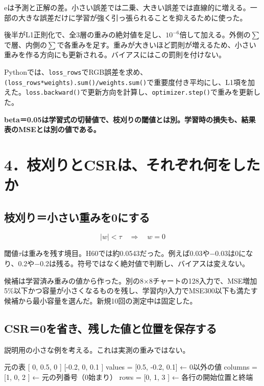 \documentclass[
  11pt,
  a4paper,
]{article}
\newenvironment{Shaded}{}{}
\newcommand{\NormalTok}[1]{#1}
\begin{document}
eは予測と正解の差。小さい誤差では二乗、大きい誤差では直線的に増える。一部の大きな誤差だけに学習が強く引っ張られることを抑えるために使った。

後半がL1正則化で、全3層の重みの絶対値を足し、\(10^{-6}\)倍して加える。外側の\(\sum\)で層、内側の\(\sum\)で各重みを足す。重みが大きいほど罰則が増えるため、小さい重みを作る方向にも更新される。バイアスにはこの罰則を付けない。

Pythonでは、\texttt{loss\_rows}でRGB誤差を求め、\texttt{(loss\_rows*weights).sum()/weights.sum()}で重要度付き平均にし、L1項を加えた。\texttt{loss.backward()}で更新方向を計算し、\texttt{optimizer.step()}で重みを更新した。

\textbf{beta＝0.05は学習式の切替値で、枝刈りの閾値とは別。学習時の損失も、結果表のMSEとは別の値である。}

\newpage

\section{4．枝刈りとCSRは、それぞれ何をしたか}\label{ux679dux5208ux308aux3068csrux306fux305dux308cux305eux308cux4f55ux3092ux3057ux305fux304b}

\subsection{枝刈り＝小さい重みを0にする}\label{ux679dux5208ux308aux5c0fux3055ux3044ux91cdux307fux30920ux306bux3059ux308b}

\[|w|<\tau\quad\Rightarrow\quad w=0\]

閾値\(\tau\)は重みを残す境目。H60では約0.0543だった。例えば0.03や−0.03は0になり、0.2や−0.2は残る。符号ではなく絶対値で判断し、バイアスは変えない。

候補は学習済み重みの値から作った。別の8×8チャートの128入力で、MSE増加5\%以下かつ容量が小さくなるものを残し、学習内9入力でMSE300以下も満たす候補から最小容量を選んだ。新規10回の測定中は固定した。

\subsection{CSR＝0を省き、残した値と位置を保存する}\label{csr0ux3092ux7701ux304dux6b8bux3057ux305fux5024ux3068ux4f4dux7f6eux3092ux4fddux5b58ux3059ux308b}

説明用の小さな例を考える。これは実測の重みではない。

\begin{Shaded}
\begin{Highlighting}[]
\NormalTok{元の表       [ 0,    0.5, 0   ]}
\NormalTok{             [{-}0.2,  0,   0.1 ]}
\NormalTok{values  = [0.5, {-}0.2, 0.1]   ← 0以外の値}
\NormalTok{columns = [1,    0,   2  ]   ← 元の列番号（0始まり）}
\NormalTok{rows    = [0,    1,   3  ]   ← 各行の開始位置と終端}
\end{Highlighting}
\end{Shaded}
\end{document}
